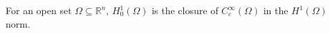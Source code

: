 
For an open set $\Omega\subseteq\mathbb R^n$, $H_0^1(\Omega)$ is the closure of $C_c^\infty(\Omega)$ in the $H^1(\Omega)$ norm.
